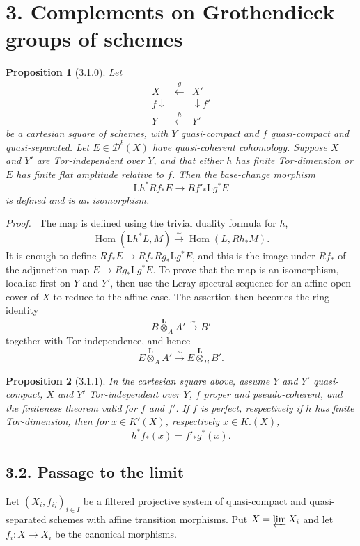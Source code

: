 \documentclass[11pt]{article}
\theoremstyle{plain}
\newtheorem*{proposition*}{Proposition}
\theoremstyle{definition}
\theoremstyle{remark}
\newenvironment{prooftext}{\par\noindent\textit{Proof.}\ }{\par\medskip}
\newcommand{\D}{\mathcal D}\newcommand{\E}{\mathcal E}\newcommand{\F}{\mathcal F}
\DeclareMathOperator{\Hom}{Hom}
\providecommand{\iso}{\xrightarrow{\sim}}
\providecommand{\Ltens}{\overset{\mathbf L}{\otimes}}
\begin{document}
\section*{3. Complements on Grothendieck groups of schemes}

\begin{proposition*}[3.1.0]
Let
\[
\begin{array}{ccc}
X & \xleftarrow{g} & X'\\
f\downarrow && \downarrow f'\\
Y & \xleftarrow{h} & Y'
\end{array}
\]
be a cartesian square of schemes, with $Y$ quasi-compact and $f$ quasi-compact and quasi-separated. Let $E\in\D^b(X)$ have quasi-coherent cohomology. Suppose $X$ and $Y'$ are Tor-independent over $Y$, and that either $h$ has finite Tor-dimension or $E$ has finite flat amplitude relative to $f$. Then the base-change morphism
\[
\mathrm Lh^*Rf_*E\longrightarrow Rf'_*\mathrm Lg^*E
\]
is defined and is an isomorphism.
\end{proposition*}

\begin{prooftext}
The map is defined using the trivial duality formula for $h$,
\[
\Hom(\mathrm Lh^*L,M)\iso\Hom(L,Rh_*M).
\]
It is enough to define $Rf_*E\to Rf_*Rg_*\mathrm Lg^*E$, and this is the image under $Rf_*$ of the adjunction map $E\to Rg_*\mathrm Lg^*E$. To prove that the map is an isomorphism, localize first on $Y$ and $Y'$, then use the Leray spectral sequence for an affine open cover of $X$ to reduce to the affine case. The assertion then becomes the ring identity
\[
B\Ltens_A A'\iso B'
\]
together with Tor-independence, and hence
\[
E\Ltens_A A'\iso E\Ltens_B B'.
\]
\end{prooftext}

\begin{proposition*}[3.1.1]
In the cartesian square above, assume $Y$ and $Y'$ quasi-compact, $X$ and $Y'$ Tor-independent over $Y$, $f$ proper and pseudo-coherent, and the finiteness theorem valid for $f$ and $f'$. If $f$ is perfect, respectively if $h$ has finite Tor-dimension, then for $x\in K'(X)$, respectively $x\in K.(X)$,
\[
h^*f_*(x)=f'_*g^*(x).
\]
\end{proposition*}

\subsection*{3.2. Passage to the limit}
Let $(X_i,f_{ij})_{i\in I}$ be a filtered projective system of quasi-compact and quasi-separated schemes with affine transition morphisms. Put $X=\varprojlim X_i$ and let $f_i:X\to X_i$ be the canonical morphisms.
\end{document}

